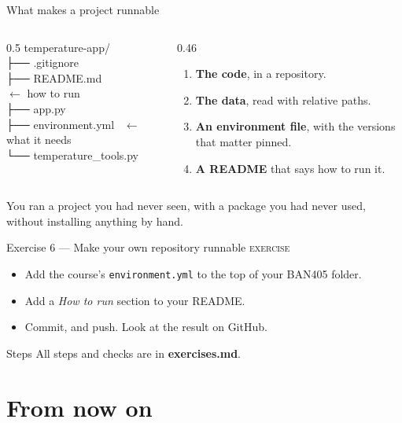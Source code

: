 \documentclass[aspectratio=169,11pt]{beamer}
\newcommand{\code}[1]{\texttt{#1}}
\newcommand{\key}[1]{\textbf{\textcolor{ban}{#1}}}
\newcommand{\exerciseframe}[3]{%
  \begin{frame}[t]{#1}
    \vspace{0.4em}
    {\small\textcolor{softgray}{\textsc{exercise}}}\par\vspace{0.6em}
    #2
    \vfill
    \begin{block}{Steps}
      All steps and checks are in \key{exercises.md}. #3
    \end{block}
    \vspace{0.6em}
  \end{frame}}
\begin{document}
\begin{frame}{What makes a project runnable}
  \begin{columns}[T]
    \begin{column}{0.5\textwidth}
      \ttfamily\footnotesize
      temperature-app/\\
      ├── .gitignore\\
      ├── README.md \ \ \ \ \ \ \ \ \textcolor{ban}{$\leftarrow$ how to run}\\
      ├── app.py\\
      ├── environment.yml \ \textcolor{ban}{$\leftarrow$ what it needs}\\
      └── temperature\_tools.py
    \end{column}
    \begin{column}{0.46\textwidth}
      \begin{enumerate}
        \item \textbf{The code}, in a repository.
        \item \textbf{The data}, read with relative paths.
        \item \textbf{An environment file}, with the versions that matter pinned.
        \item \textbf{A README} that says how to run it.
      \end{enumerate}
    \end{column}
  \end{columns}
  \vspace{1.2em}
  \centering
  You ran a project you had never seen, with a package you had never used,\\
  without installing anything by hand.
\end{frame}

\exerciseframe{Exercise 6 --- Make your own repository runnable}{%
  \begin{itemize}
    \item Add the course's \code{environment.yml} to the top of your BAN405 folder.
    \item Add a \emph{How to run} section to your README.
    \item Commit, and push. Look at the result on GitHub.
  \end{itemize}}{}

\section{From now on}
\end{document}
